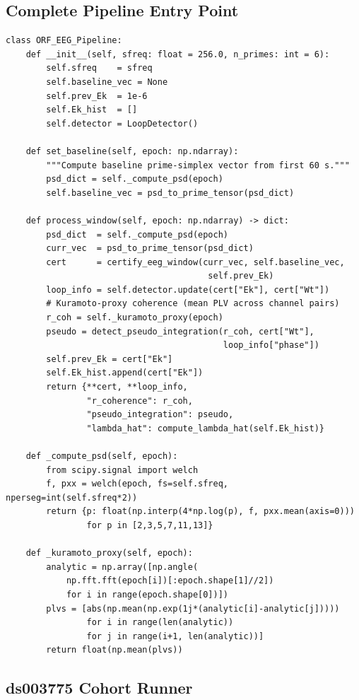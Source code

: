 \documentclass[12pt,a4paper]{article}
\theoremstyle{definition}
\begin{document}
\subsection{Complete Pipeline Entry Point}

\begin{lstlisting}[style=orfpython,caption={Main \texttt{ORF\_EEG\_Pipeline} — end-to-end window processor}]
class ORF_EEG_Pipeline:
    def __init__(self, sfreq: float = 256.0, n_primes: int = 6):
        self.sfreq    = sfreq
        self.baseline_vec = None
        self.prev_Ek  = 1e-6
        self.Ek_hist  = []
        self.detector = LoopDetector()

    def set_baseline(self, epoch: np.ndarray):
        """Compute baseline prime-simplex vector from first 60 s."""
        psd_dict = self._compute_psd(epoch)
        self.baseline_vec = psd_to_prime_tensor(psd_dict)

    def process_window(self, epoch: np.ndarray) -> dict:
        psd_dict  = self._compute_psd(epoch)
        curr_vec  = psd_to_prime_tensor(psd_dict)
        cert      = certify_eeg_window(curr_vec, self.baseline_vec,
                                        self.prev_Ek)
        loop_info = self.detector.update(cert["Ek"], cert["Wt"])
        # Kuramoto-proxy coherence (mean PLV across channel pairs)
        r_coh = self._kuramoto_proxy(epoch)
        pseudo = detect_pseudo_integration(r_coh, cert["Wt"],
                                           loop_info["phase"])
        self.prev_Ek = cert["Ek"]
        self.Ek_hist.append(cert["Ek"])
        return {**cert, **loop_info,
                "r_coherence": r_coh,
                "pseudo_integration": pseudo,
                "lambda_hat": compute_lambda_hat(self.Ek_hist)}

    def _compute_psd(self, epoch):
        from scipy.signal import welch
        f, pxx = welch(epoch, fs=self.sfreq, nperseg=int(self.sfreq*2))
        return {p: float(np.interp(4*np.log(p), f, pxx.mean(axis=0)))
                for p in [2,3,5,7,11,13]}

    def _kuramoto_proxy(self, epoch):
        analytic = np.array([np.angle(
            np.fft.fft(epoch[i])[:epoch.shape[1]//2])
            for i in range(epoch.shape[0])])
        plvs = [abs(np.mean(np.exp(1j*(analytic[i]-analytic[j]))))
                for i in range(len(analytic))
                for j in range(i+1, len(analytic))]
        return float(np.mean(plvs))
\end{lstlisting}

\subsection{ds003775 Cohort Runner}
\end{document}

